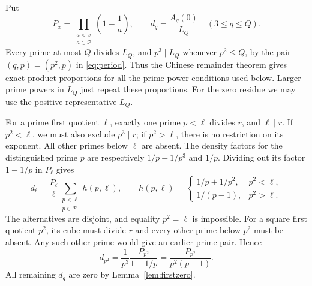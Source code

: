 \documentclass[11pt]{article}
\newcommand{\PP}{\mathcal P}
\begin{document}
Put
\[
 P_x=\prod_{\substack{a<x\\a\in\PP}}\left(1-\frac1a\right),
 \qquad d_q=\frac{A_q(0)}{L_Q}\quad(3\le q\le Q).
\]
Every prime at most $Q$ divides $L_Q$, and $p^3\mid L_Q$ whenever
$p^2\le Q$, by the pair $(q,p)=(p^2,p)$ in \eqref{eq:period}.
Thus the Chinese remainder theorem gives exact product proportions
for all the prime-power conditions used below. Larger prime powers in
$L_Q$ just repeat these proportions. For the zero residue we may use
the positive representative $L_Q$.

For a prime first quotient $\ell$, exactly one prime $p<\ell$ divides
$r$, and $\ell\mid r$. If $p^2<\ell$, we must also exclude
$p^3\mid r$; if $p^2>\ell$, there is no restriction on its exponent.
All other primes below $\ell$ are absent. The density factors for
the distinguished prime $p$ are respectively $1/p-1/p^3$ and $1/p$.
Dividing out its factor $1-1/p$ in $P_\ell$ gives
\begin{equation}\label{eq:primedensity}
 d_\ell=\frac{P_\ell}{\ell}
 \sum_{\substack{p<\ell\\p\in\PP}}h(p,\ell),\qquad
 h(p,\ell)=
 \begin{cases}
  1/p+1/p^2,&p^2<\ell,\\
  1/(p-1),&p^2>\ell.
 \end{cases}
\end{equation}
The alternatives are disjoint, and equality $p^2=\ell$ is impossible.
For a square first quotient $p^2$, its cube must divide $r$ and every
other prime below $p^2$ must be absent. Any such other prime would
give an earlier prime pair. Hence
\begin{equation}\label{eq:squaredensity}
 d_{p^2}=\frac{1}{p^3}\frac{P_{p^2}}{1-1/p}
        =\frac{P_{p^2}}{p^2(p-1)}.
\end{equation}
All remaining $d_q$ are zero by Lemma~\ref{lem:firstzero}.
\end{document}
